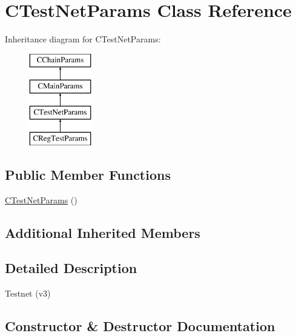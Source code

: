 \hypertarget{class_c_test_net_params}{}\section{C\+Test\+Net\+Params Class Reference}
\label{class_c_test_net_params}
Inheritance diagram for C\+Test\+Net\+Params\+:\begin{figure}[H]
\begin{center}
\leavevmode
\includegraphics[height=4.000000cm]{class_c_test_net_params}
\end{center}
\end{figure}
\subsection*{Public Member Functions}
\begin{DoxyCompactItemize}
\item 
\mbox{\hyperlink{class_c_test_net_params_abbd5f6e3e94bc8abf99a5dfaff75374a}{C\+Test\+Net\+Params}} ()
\end{DoxyCompactItemize}
\subsection*{Additional Inherited Members}


\subsection{Detailed Description}
Testnet (v3) 

\subsection{Constructor \& Destructor Documentation}
\mbox{\label{class_c_test_net_params_abbd5f6e3e94bc8abf99a5dfaff75374a}} 
